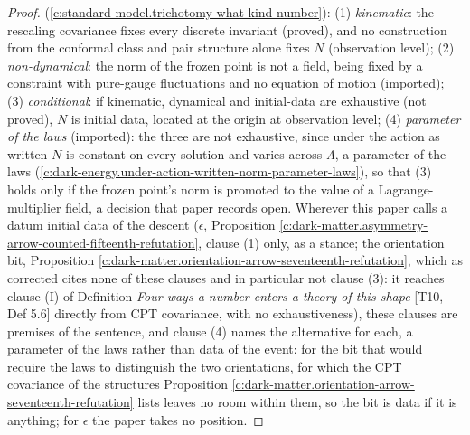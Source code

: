 \documentclass[11pt]{article}
\theoremstyle{definition}
\theoremstyle{plain}
\begin{document}
\begin{proof}
\cite[Prop.~7.6]{ButlerT12} (\ref{c:standard-model.trichotomy-what-kind-number}): (1) \emph{kinematic}: the rescaling covariance fixes every discrete invariant (proved), and no construction from the conformal class and pair structure alone fixes $N$ (observation level); (2) \emph{non-dynamical}: the norm of the frozen point is not a field, being fixed by a constraint with pure-gauge fluctuations and no equation of motion (imported); (3) \emph{conditional}: if kinematic, dynamical and initial-data are exhaustive (not proved), $N$ is initial data, located at the origin at observation level; (4) \emph{parameter of the laws} (imported): the three are not exhaustive, since under the action as written $N$ is constant on every solution and varies across $\Lambda$, a parameter of the laws \cite[Prop.~5.8]{ButlerT10} (\ref{c:dark-energy.under-action-written-norm-parameter-laws}), so that (3) holds only if the frozen point's norm is promoted to the value of a Lagrange-multiplier field, a decision that paper records open. Wherever this paper calls a datum initial data of the descent ($\epsilon$, Proposition \ref{c:dark-matter.asymmetry-arrow-counted-fifteenth-refutation}, clause (1) only, as a stance; the orientation bit, Proposition \ref{c:dark-matter.orientation-arrow-seventeenth-refutation}, which as corrected cites none of these clauses and in particular not clause (3): it reaches clause (I) of Definition \emph{Four ways a number enters a theory of this shape} [T10, Def 5.6] directly from CPT covariance, with no exhaustiveness), these clauses are premises of the sentence, and clause (4) names the alternative for each, a parameter of the laws rather than data of the event: for the bit that would require the laws to distinguish the two orientations, for which the CPT covariance of the structures Proposition \ref{c:dark-matter.orientation-arrow-seventeenth-refutation} lists leaves no room within them, so the bit is data if it is anything; for $\epsilon$ the paper takes no position.

\end{proof}
\end{document}

